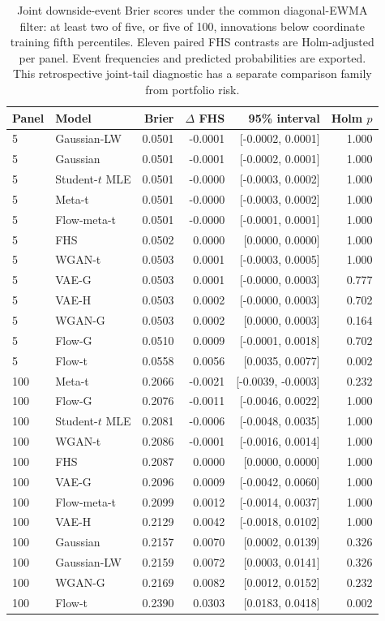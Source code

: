 \documentclass[11pt]{article}
\theoremstyle{definition}\newtheorem{definition}[theorem]{Definition}
\theoremstyle{remark}\newtheorem{remark}[theorem]{Remark}
\begin{document}
\begin{table}[htbp]
\centering\footnotesize
\setlength{\tabcolsep}{4pt}
\begin{tabular}{llrrrr}
\toprule
Panel & Model & Brier & $\Delta$ FHS & 95\% interval & Holm $p$ \\
\midrule
5 & Gaussian-LW & 0.0501 & -0.0001 & [-0.0002, 0.0001] & 1.000 \\
5 & Gaussian & 0.0501 & -0.0001 & [-0.0002, 0.0001] & 1.000 \\
5 & Student-$t$ MLE & 0.0501 & -0.0000 & [-0.0003, 0.0002] & 1.000 \\
5 & Meta-t & 0.0501 & -0.0000 & [-0.0003, 0.0002] & 1.000 \\
5 & Flow-meta-t & 0.0501 & -0.0000 & [-0.0001, 0.0001] & 1.000 \\
5 & FHS & 0.0502 & 0.0000 & [0.0000, 0.0000] & 1.000 \\
5 & WGAN-t & 0.0503 & 0.0001 & [-0.0003, 0.0005] & 1.000 \\
5 & VAE-G & 0.0503 & 0.0001 & [-0.0000, 0.0003] & 0.777 \\
5 & VAE-H & 0.0503 & 0.0002 & [-0.0000, 0.0003] & 0.702 \\
5 & WGAN-G & 0.0503 & 0.0002 & [0.0000, 0.0003] & 0.164 \\
5 & Flow-G & 0.0510 & 0.0009 & [-0.0001, 0.0018] & 0.702 \\
5 & Flow-t & 0.0558 & 0.0056 & [0.0035, 0.0077] & 0.002 \\
100 & Meta-t & 0.2066 & -0.0021 & [-0.0039, -0.0003] & 0.232 \\
100 & Flow-G & 0.2076 & -0.0011 & [-0.0046, 0.0022] & 1.000 \\
100 & Student-$t$ MLE & 0.2081 & -0.0006 & [-0.0048, 0.0035] & 1.000 \\
100 & WGAN-t & 0.2086 & -0.0001 & [-0.0016, 0.0014] & 1.000 \\
100 & FHS & 0.2087 & 0.0000 & [0.0000, 0.0000] & 1.000 \\
100 & VAE-G & 0.2096 & 0.0009 & [-0.0042, 0.0060] & 1.000 \\
100 & Flow-meta-t & 0.2099 & 0.0012 & [-0.0014, 0.0037] & 1.000 \\
100 & VAE-H & 0.2129 & 0.0042 & [-0.0018, 0.0102] & 1.000 \\
100 & Gaussian & 0.2157 & 0.0070 & [0.0002, 0.0139] & 0.326 \\
100 & Gaussian-LW & 0.2159 & 0.0072 & [0.0003, 0.0141] & 0.326 \\
100 & WGAN-G & 0.2169 & 0.0082 & [0.0012, 0.0152] & 0.232 \\
100 & Flow-t & 0.2390 & 0.0303 & [0.0183, 0.0418] & 0.002 \\
\bottomrule
\end{tabular}
\caption{Joint downside-event Brier scores under the common diagonal-EWMA filter: at least two of five, or five of 100, innovations below coordinate training fifth percentiles. Eleven paired FHS contrasts are Holm-adjusted per panel. Event frequencies and predicted probabilities are exported. This retrospective joint-tail diagnostic has a separate comparison family from portfolio risk.}\label{tab:r4-joint}
\end{table}
\end{document}

